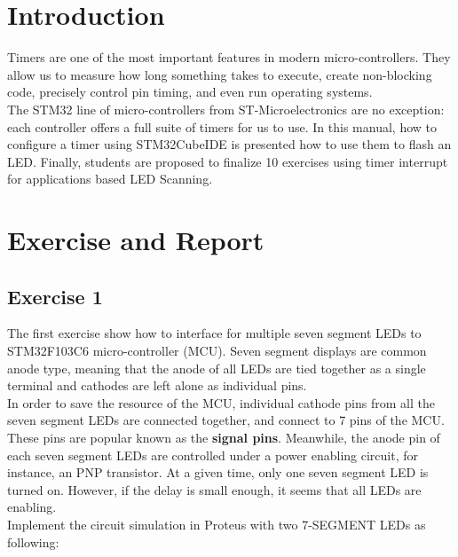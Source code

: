
\section{Introduction}
Timers are one of the most important features in modern micro-controllers. They allow us to measure how long something takes to execute, create non-blocking code, precisely control pin timing, and even run operating systems.\\

The STM32 line of micro-controllers from ST-Microelectronics are no exception: each controller offers a full suite of timers for us to use. In this manual, how to configure a timer using STM32CubeIDE is presented how to use them to flash an LED. Finally, students are proposed to finalize 10 exercises using timer interrupt for applications based LED Scanning.

\newpage
\section{Exercise and Report}
\subsection{Exercise 1}
The first exercise show how to interface for multiple seven segment LEDs to STM32F103C6 micro-controller (MCU). Seven segment displays are common anode type, meaning that the anode of all LEDs are tied together as a single terminal and cathodes are left alone as individual pins. \\

In order to save the resource of the MCU, individual cathode pins from all the seven segment LEDs are connected together, and connect to 7 pins of the MCU. These pins are popular known as the \textbf{signal pins}. Meanwhile, the anode pin of each seven segment LEDs are controlled under a power enabling circuit, for instance, an PNP transistor. At a given time, only one seven segment LED is turned on. However, if the delay is small enough, it seems that all LEDs are enabling. \\

Implement the circuit simulation in Proteus with two 7-SEGMENT LEDs as following:

